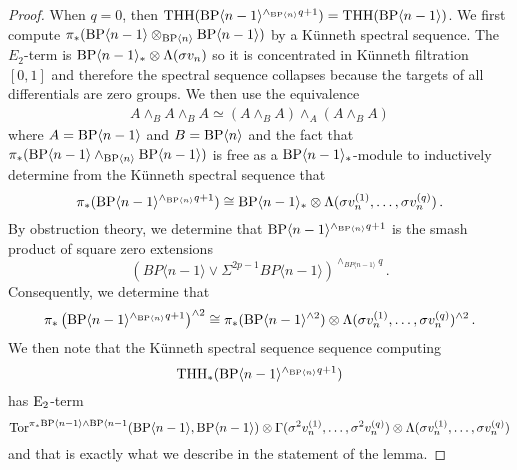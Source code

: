 \begin{proof}
When $q=0$, then $\operatorname{THH}(\mathrm{BP}\langle n-1\rangle^{\wedge_{\mathrm{BP}\langle n\rangle}q+1})=\operatorname{THH}(\mathrm{BP}\langle n-1\rangle)$. 
We first compute 
$\pi_{*}(\mathrm{BP}\langle n-1\rangle\otimes_{\mathrm{BP}\langle n\rangle}\mathrm{BP}\langle n-1\rangle)$ by a K\"unneth spectral sequence. 
The $E_{2}$-term is $\mathrm{BP}\langle n-1\rangle_{*}\otimes \Lambda (\sigma v_{n})$ so it is concentrated in K\"unneth filtration $[0,1]$ and therefore the spectral sequence collapses because the targets of all differentials are zero groups. 
We then use the equivalence 
\begin{align*}
A\wedge_{B}A\wedge_{B}A\simeq (A\wedge_{B}A)\wedge_{A}(A\wedge_{B}A)
\end{align*}
where $A=\mathrm{BP}\langle n-1\rangle$ and $B=\mathrm{BP}\langle n\rangle$ and the fact that $\pi_{*}(\mathrm{BP}\langle n-1\rangle\wedge_{\mathrm{BP}\langle n\rangle}\mathrm{BP}\langle n-1\rangle)$ is free as a $\mathrm{BP}\langle n-1\rangle_{*}$-module to inductively determine from the K\"unneth spectral sequence that 
\[ \pi_{*}(\mathrm{BP} \langle n-1\rangle ^{\wedge_{\mathrm{BP}\langle n\rangle}q+1})\cong \mathrm{BP}\langle n-1\rangle_{*}\otimes \Lambda (\sigma v_{n}^{(1)},\dots ,\sigma v_{n}^{(q)})\,.\]
By obstruction theory, we determine that $\mathrm{BP} \langle n-1\rangle ^{\wedge_{\mathrm{BP}\langle n\rangle}q+1}$ is the smash product of square zero extensions 
\[ \left ( BP\langle n-1\rangle \vee \Sigma^{2p-1} BP\langle n-1\rangle \right )^{\wedge_{ BP\langle n-1\rangle}q} \,.\]
Consequently, we determine that 
\[ \pi_{*}\left ( \mathrm{BP} \langle n-1\rangle ^{\wedge_{\mathrm{BP}\langle n\rangle}q+1} \right )^{\wedge 2}\cong \pi_{*}(\mathrm{BP} \langle n-1\rangle^{\wedge 2})\otimes \Lambda (\sigma v_{n}^{(1)},\dots ,\sigma v_{n}^{(q)})^{\wedge 2} \,.\]
We then note that the K\"unneth spectral sequence sequence computing 
\[\operatorname{THH}_{*}(\mathrm{BP} \langle n-1\rangle^{\wedge_{\mathrm{BP}\langle n\rangle} q+1} )\] 
has $\mathrm{E}_{2}$-term
\[ \operatorname{Tor}^{\pi_{*}\mathrm{BP}\langle n-1\rangle \wedge \mathrm{BP}\langle n-1}(\mathrm{BP} \langle n-1\rangle,\mathrm{BP} \langle n-1\rangle)\otimes \Gamma (\sigma^{2} v_{n}^{(1)},\dots ,\sigma^{2}v_{n}^{(q)})\otimes \Lambda (\sigma v_{n}^{(1)},\dots ,\sigma v_{n}^{(q)})\]
and that is exactly what we describe in the statement of the lemma. 
\end{proof}

